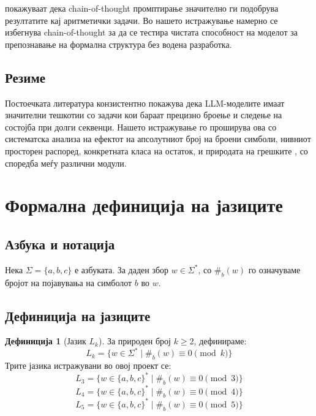 \documentclass[12pt,a4paper]{article}
\theoremstyle{definition}
\newtheorem{definition}{Дефиниција}
\begin{document}
\textcite{wei2022chain} покажуваат дека chain-of-thought промптирање значително ги подобрува резултатите кај аритметички задачи. Во нашето истражување намерно се избегнува chain-of-thought за да се тестира чистата способност на моделот за препознавање на формална структура без водена разработка.

\vspace{0.8em}

\subsection{Резиме}

Постоечката литература конзистентно покажува дека LLM-моделите имаат значителни тешкотии со задачи кои бараат прецизно броење и следење на состојба при долги секвенци. Нашето истражување го проширува ова со систематска анализа на ефектот на апсолутниот број на броени симболи, нивниот просторен распоред, конкретната класа на остаток, и природата на грешките , со споредба меѓу различни модули.

\section{Формална дефиниција на јазиците}

\subsection{Азбука и нотација}

Нека $\Sigma = \{a, b, c\}$ е азбуката. За даден збор $w \in \Sigma^*$, со $\#_b(w)$ го означуваме бројот на појавувања на симболот $b$ во $w$.

\subsection{Дефиниција на јазиците}

\begin{definition}[Јазик $L_k$]
За природен број $k \geq 2$, дефинираме:
\[
L_k = \{ w \in \Sigma^* \mid \#_b(w) \equiv 0 \pmod{k} \}
\]
Трите јазика истражувани во овој проект се:
\[
L_3 = \{ w \in \{a,b,c\}^* \mid \#_b(w) \equiv 0 \pmod{3} \}
\]
\[
L_4 = \{ w \in \{a,b,c\}^* \mid \#_b(w) \equiv 0 \pmod{4} \}
\]
\[
L_5 = \{ w \in \{a,b,c\}^* \mid \#_b(w) \equiv 0 \pmod{5} \}
\]
\end{definition}
\end{document}
